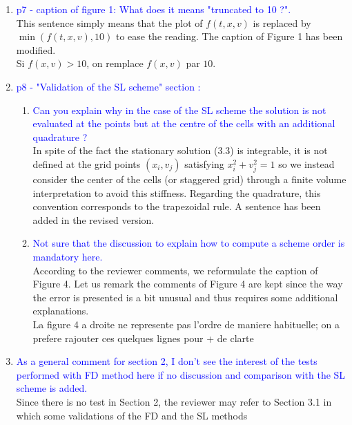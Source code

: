 \documentclass{article}
\begin{document}
\begin{enumerate}
    \item \textcolor{blue}{p7 - caption of figure 1: What does it means "truncated to 10 ?". }\\
    This sentence simply means that the plot of $f(t, x, v)$ is replaced by $\min(f(t, x, v), 10)$ to ease the reading. The caption of Figure 1 has been modified. \\
    {\small Si $f(x,v)>10$, on remplace $f(x,v)$ par $10$. }
    \item \textcolor{blue}{p8 - "Validation of the SL scheme" section :}
\begin{enumerate}
\item \textcolor{blue}{Can you explain why in the case of the SL scheme the solution is not evaluated at the points but at the centre of the cells with an additional quadrature ?}\\
In spite of the fact the stationary solution (3.3) is integrable, it is not defined at the grid points $(x_i, v_j)$ satisfying $x_i^2+v_j^2=1$ 
so we instead consider the center of the cells (or staggered grid) through a finite volume interpretation to avoid this stiffness. 
Regarding the quadrature, this convention corresponds to the trapezoidal rule.  A sentence has been added in the revised version. \\
\item  \textcolor{blue}{Not sure that the discussion to explain how to compute a scheme order is mandatory here.}\\
According to the reviewer comments, we reformulate the caption of Figure 4. Let us remark the comments of Figure 4 
are kept since the way the error is presented is a bit unusual and thus requires some additional explanations. \\ 
{\small La figure 4 a droite ne represente pas l'ordre de maniere habituelle; on a prefere rajouter ces quelques lignes pour + de clarte}
\end{enumerate}
    \item \textcolor{blue}{As a general comment for section 2, I don't see the interest of the tests performed with FD method here if no discussion and comparison with the SL scheme is added. }\\ 
    Since there is no test in Section 2, the reviewer may refer to Section 3.1 in which some validations of the FD and the SL methods 

\end{enumerate}
\end{document}
